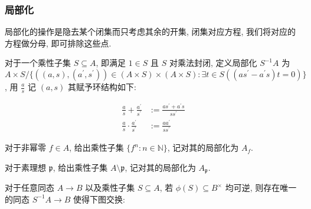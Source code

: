 \subsubsection{局部化}

局部化的操作是隐去某个闭集而只考虑其余的开集, 闭集对应方程, 我们将对应的方程做分母, 即可排除这些点.

\begin{definition}[局部化]
    对于一个乘性子集 \(S \subseteq A\), 即满足 \(1 \in S\) 且 \(S\) 对乘法封闭, 定义局部化 \(S^{-1} A\) 为 \(A \times S / \{((a,s),(a^\prime,s^\prime)) \in (A \times S) \times (A \times S) : \exists t \in S ((a s^\prime - a^\prime s) t = 0)\}\), 
    用 \(\frac{a}{s}\) 记 \((a,s)\) 其赋予环结构如下:

    \[
        \begin{aligned}
            \frac{a}{s} + \frac{a^\prime}{s^\prime} &:= \frac{a s^\prime + a^\prime s}{s s^\prime} \\
            \frac{a}{s} \cdot \frac{a^\prime}{s^\prime} &:= \frac{a a^\prime}{s s^\prime}
        \end{aligned}
    \]
\end{definition}

\begin{example}
    对于非幂零 \(f \in A\), 给出乘性子集 \(\{f^n : n \in \mathbb{N}\}\), 记对其的局部化为 \(A_f\).
\end{example}

\begin{example}
    对于素理想 \(\mathfrak{p}\), 给出乘性子集 \(A \setminus \mathfrak{p}\), 记对其的局部化为 \(A_{\mathfrak{p}}\).
\end{example}

\begin{lemma}[局部化的泛性质]
    对于任意同态 \(A \to B\) 以及乘性子集 \(S \subseteq A\), 若 \(\phi (S) \subseteq B^{\times}\) 均可逆,
    则存在唯一的同态 \(S^{-1} A \to B\) 使得下图交换:

    \begin{center}
    \end{center}
\end{lemma}

